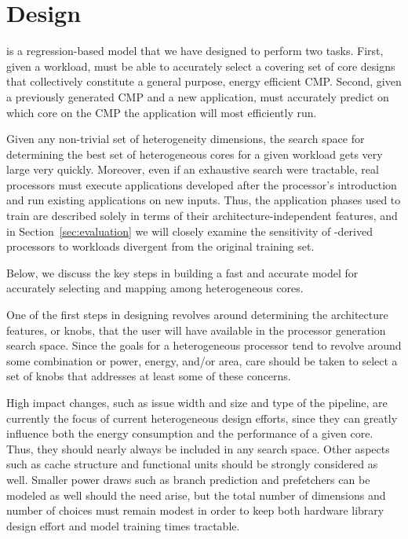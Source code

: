 \section{\blackBox{} Design}
\label{sec:design}


\blackBox{} is a regression-based model that we have designed to
perform two tasks. First, given a workload, \blackBox{} must be able
to accurately select a covering set of core designs that collectively
constitute a general purpose, energy efficient CMP. Second, given a
previously generated CMP and a new application, \blackBox{} must
accurately predict on which core on the CMP the application will most
efficiently run.

Given any non-trivial set of heterogeneity dimensions, the search
space for determining the best set of heterogeneous cores for a given
workload gets very large very quickly. Moreover, even if an exhaustive
search were tractable, real processors must execute applications
developed after the processor's introduction and run existing
applications on new inputs. Thus, the application phases used to train
\blackBox{} are described solely in terms of their
architecture-independent features, and in Section~\ref{sec:evaluation}
we will closely examine the sensitivity of \blackBox{}-derived
processors to workloads divergent from the original training set.

Below, we discuss the key steps in building a fast and accurate model
for accurately selecting and mapping among heterogeneous cores.

One of the first steps in designing \blackBox{} revolves around
determining the architecture features, or knobs, that the user will
have available in the processor generation search space.  Since the
goals for a heterogeneous processor tend to revolve around some
combination or power, energy, and/or area, care should be taken to
select a set of knobs that addresses at least some of these concerns.

High impact changes, such as issue width and size and type of the
pipeline, are currently the focus of current heterogeneous 
design efforts, since they can greatly influence
both the energy consumption and the performance of a given core. Thus, 
they should nearly always be included in any search space. Other 
aspects such as cache structure and functional units should be strongly considered 
as well. Smaller power draws such as branch prediction
and prefetchers can be modeled as well should the need arise, but
 the total number of dimensions and number of choices must
remain modest in order to keep both hardware library design effort and
model training times tractable.

